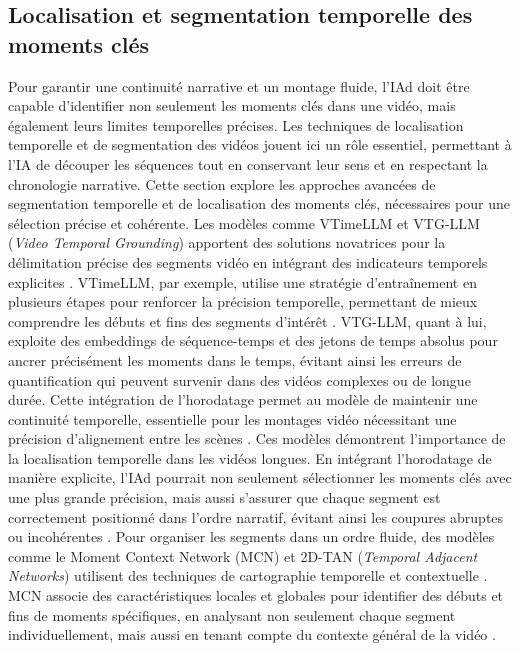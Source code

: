 \documentclass[livre]{udes-genie-these}
\begin{document}
\subsection{Localisation et segmentation temporelle des moments clés}
Pour garantir une continuité narrative et un montage fluide, l'IAd doit être capable d'identifier non seulement les moments clés dans une vidéo, mais également leurs limites temporelles précises. Les techniques de localisation temporelle et de segmentation des vidéos jouent ici un rôle essentiel, permettant à l'IA de découper les séquences tout en conservant leur sens et en respectant la chronologie narrative. Cette section explore les approches avancées de segmentation temporelle et de localisation des moments clés, nécessaires pour une sélection précise et cohérente.
Les modèles comme VTimeLLM et VTG-LLM (\textit{Video Temporal Grounding}) apportent des solutions novatrices pour la délimitation précise des segments vidéo en intégrant des indicateurs temporels explicites \cite{huang2024_vtimellm}\cite{guo2024_vtgllm}. VTimeLLM, par exemple, utilise une stratégie d'entraînement en plusieurs étapes pour renforcer la précision temporelle, permettant de mieux comprendre les débuts et fins des segments d'intérêt \cite{han2024_clip}\cite{lei2021_clipbert}.
VTG-LLM, quant à lui, exploite des embeddings de séquence-temps et des jetons de temps absolus pour ancrer précisément les moments dans le temps, évitant ainsi les erreurs de quantification qui peuvent survenir dans des vidéos complexes ou de longue durée. Cette intégration de l'horodatage permet au modèle de maintenir une continuité temporelle, essentielle pour les montages vidéo nécessitant une précision d'alignement entre les scènes \cite{guo2024_vtgllm}\cite{you2023_ferret}.
Ces modèles démontrent l'importance de la localisation temporelle dans les vidéos longues. En intégrant l'horodatage de manière explicite, l'IAd pourrait non seulement sélectionner les moments clés avec une plus grande précision, mais aussi s'assurer que chaque segment est correctement positionné dans l'ordre narratif, évitant ainsi les coupures abruptes ou incohérentes \cite{lei2021_clipbert}\cite{anonymous2017_localizing}.
Pour organiser les segments dans un ordre fluide, des modèles comme le Moment Context Network (MCN) et 2D-TAN (\textit{Temporal Adjacent Networks})  utilisent des techniques de cartographie temporelle et contextuelle \cite{ghosh2019_excl}\cite{zhang2016_lstm}. MCN associe des caractéristiques locales et globales pour identifier des débuts et fins de moments spécifiques, en analysant non seulement chaque segment individuellement, mais aussi en tenant compte du contexte général de la vidéo \cite{zhang2016_lstm}\cite{zhang2019_memory}.
\end{document}
